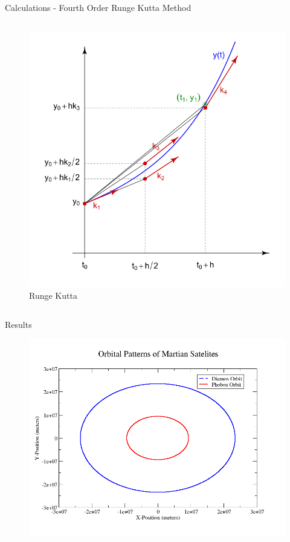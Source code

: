 \documentclass{beamer}	%
\begin{document}
\begin{frame}{Calculations - Fourth Order Runge Kutta Method}
\begin{columns}
\begin{column}{0.50\textwidth}
\begin{figure}
\label{fig:3}
\caption{Runge Kutta}
\includegraphics[scale=0.35]{runge-kutta}
\end{figure}
 \end{column}
\end{columns}

\end{frame}

\begin{frame}{Results}
\begin{figure}
\label{fig:4}
\includegraphics[scale=0.35]{orbits}
\end{figure}
\end{frame}
\end{document}
